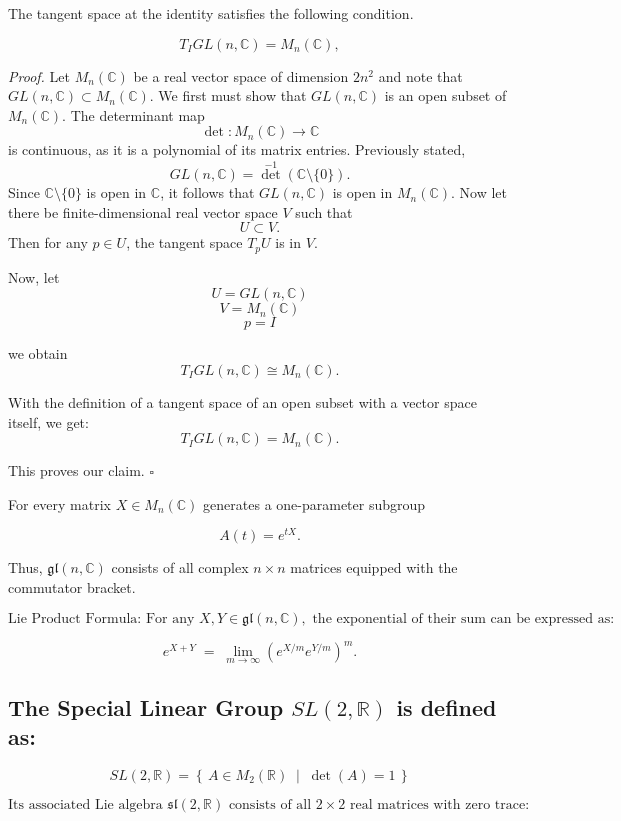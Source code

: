 \documentclass{article}
\theoremstyle{definition}
\begin{document}
The tangent space at the identity satisfies the following condition.

\[
T_I GL(n,\mathbb{C}) = M_n(\mathbb{C}),
\]

\textit{Proof.}
Let $M_n(\mathbb{C})$ be a real vector space of dimension $2n^2$ and note that
$GL(n,\mathbb{C}) \subset M_n(\mathbb{C})$. We first must show that
$GL(n,\mathbb{C})$ is an open subset of $M_n(\mathbb{C})$.
The determinant map
\[
\det : M_n(\mathbb{C}) \to \mathbb{C}
\]
is continuous, as it is a polynomial of its matrix entries. Previously stated,
\[
GL(n,\mathbb{C})=\det^{-1}(\mathbb{C}\setminus\{0\}).
\]
Since $\mathbb{C} \setminus \{0\}$ is open in $\mathbb{C}$, it follows that
$GL(n,\mathbb{C})$ is open in $M_n(\mathbb{C})$. Now let there be
finite-dimensional real vector space $V$ such that
\[
U \subset V.
\]
Then for any $p \in U$, the tangent space $T_pU$ is in $V$.

Now, let
\[
U = GL(n,\mathbb{C})
\]
\[
V = M_n(\mathbb{C})
\]
\[
p = I
\]

we obtain
\[
T_I GL(n,\mathbb{C}) \cong M_n(\mathbb{C}).
\]

With the definition of a tangent space of an open subset with a vector space itself, we get:
\[
T_I GL(n,\mathbb{C}) = M_n(\mathbb{C}).
\]

This proves our claim. \(\square\)

For every matrix $X \in M_n(\mathbb{C})$ generates a one-parameter subgroup

\[
A(t) = e^{tX}.
\]

Thus, $\mathfrak{gl}(n,\mathbb{C})$ consists of all complex $n \times n$ matrices equipped with the commutator bracket.

\[
\text{Lie Product Formula: }\text{For any } X,Y \in \mathfrak{gl}(n,\mathbb{C}),
\text{ the exponential of their sum can be expressed as:}
\]

\[
e^{X+Y} \;=\; \lim_{m\to\infty}\left(e^{X/m}e^{Y/m}\right)^m.
\]

\subsection{The Special Linear Group $SL(2,\mathbb{R})$ is defined as:}


\[
SL(2,\mathbb{R})=\left\{\,A\in M_2(\mathbb{R}) \;\middle|\; \det(A)=1\,\right\}
\]

\[
\text{Its associated Lie algebra } \mathfrak{sl}(2,\mathbb{R}) \text{ consists of all } 2\times 2
\text{ real matrices with zero trace:}
\]
\end{document}
